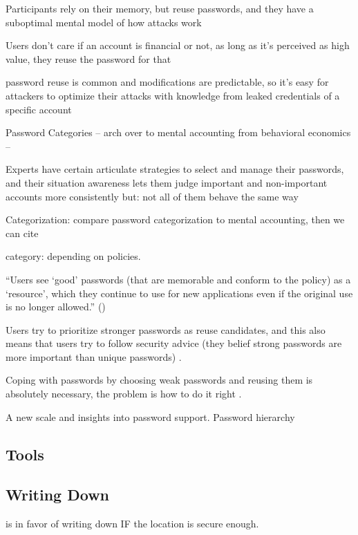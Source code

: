 	Participants rely on their memory, but reuse passwords, and they have a suboptimal mental model of how attacks work \cite{Gaw2006PasswordManagement}
	
	Users don't care if an account is financial or not, as long as it's perceived as high value, they reuse the password for that \cite{Bailey2014StatisticsReuse}
	
	password reuse is common and modifications are predictable, so it's easy for attackers to optimize their attacks with knowledge from leaked credentials of a specific account \cite{Das2014TangledWeb}

	Password Categories -- arch over to mental accounting from behavioral economics -- \cite{Thaler2004}
	
	Experts have certain articulate strategies to select and manage their passwords, and their situation awareness lets them judge important and non-important accounts more consistently  	\cite{Stobert2015ExpertPassword} 
	but: not all of them behave the same way \cite{Loutfi2015PasswordsOtherSideOfTheFence}

	Categorization: 
	compare password categorization to mental accounting, then we can cite \cite{Stockinger2015TowardsBE}
	
	category: depending on policies. \cite{Stobert2014PasswordLifeCycle}
	
	
	``Users see `good' passwords (that are memorable and conform to the policy) as a `resource', which they continue to use for new applications even if the original use is no longer allowed.'' (\cite{Inglesant2010TrueCostOfUnusablePolicies})
	
	Users try to prioritize stronger passwords as reuse candidates, and this also means that users try to follow security advice (they belief strong passwords are more important than unique passwords) \cite{Wash2016UnderstandingPasswordChoices}.
	
	Coping with passwords by choosing weak passwords and reusing them is absolutely necessary, the problem is how to do it right \cite{Florencio2014PasswordPortfoliosFiniteUser}.
	
	A new scale and insights into password support. Password hierarchy \cite{Haque2015PhdProposal}
	
	\subsection{Tools}
	
	\subsection{Writing Down}
	\cite{Herley2012PersistenceOfPasswords} is in favor of writing down IF the location is secure enough.
	
